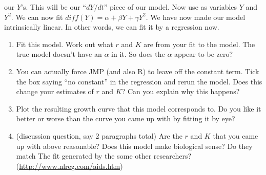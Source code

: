 \documentclass[11pt]{article}
\begin{document}
\begin{enumerate}
\begin{enumerate}
our $Y$'s.  This will be our ``$dY/dt$'' piece of our model.  Now use
as variables $Y$ and $Y^2$.  We can now fit $diff(Y) = \alpha + \beta
Y + \gamma Y^2$.  We have now made our model intrinsically linear.  In
other words, we can fit it by a regression now.  
\begin{enumerate}
\item Fit this model.  Work out what $r$ and $K$ are from your fit to
the model.  The true model doesn't have an $\alpha$ in it.  So does the
$\alpha$ appear to be zero?
\item You can actually force JMP (and also R) to leave off the
constant term.  Tick the box saying ``no constant'' in the regression
and rerun the model.  Does this change your estimates of $r$ and $K$?
Can you explain why this happens?
\item Plot the resulting growth curve that this model corresponds to.
Do you like it better or worse than the curve you came up with by
fitting it by eye?
\item (discussion question, say 2 paragraphs total) Are the $r$ and
 $K$ that you came up with above reasonable?  Does this model make
 biological sense?  Do they match The fit generated by the some other
 researchers?
  (\href{http://www.nlreg.com/aids.htm}{http://www.nlreg.com/aids.htm})
\end{enumerate}
\end{enumerate}

\end{enumerate}
\end{document}
